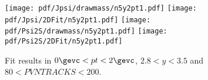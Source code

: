 \begin{figure}[H]
\begin{center}
\texttt{[image: pdf/Jpsi/drawmass/n5y2pt1.pdf]}
\texttt{[image: pdf/Jpsi/2DFit/n5y2pt1.pdf]}
\vspace*{-0.5cm}
\texttt{[image: pdf/Psi2S/drawmass/n5y2pt1.pdf]}
\texttt{[image: pdf/Psi2S/2DFit/n5y2pt1.pdf]}
\vspace*{-0.5cm}
\end{center}
\caption{Fit results in $0\gevc<pt<2\gevc$, $2.8<y<3.5$ and $80<PVNTRACKS<200$.}
\label{Fitn5y2pt1}
\end{figure}
